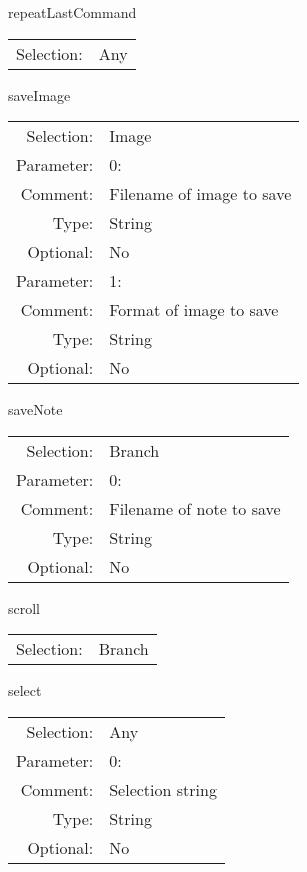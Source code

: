 \item repeatLastCommand\\
\begin{tabular}{rl}
  Selection: & Any\\
\end{tabular}

\item saveImage\\
\begin{tabular}{rl}
  Selection: & Image\\
   Parameter: &  0:\\
        Comment: & Filename of image to save\\
           Type: & String\\
       Optional: &  No\\
   Parameter: &  1:\\
        Comment: & Format of image to save\\
           Type: & String\\
       Optional: &  No\\
\end{tabular}

\item saveNote\\
\begin{tabular}{rl}
  Selection: & Branch\\
   Parameter: &  0:\\
        Comment: & Filename of note to save\\
           Type: & String\\
       Optional: &  No\\
\end{tabular}

\item scroll\\
\begin{tabular}{rl}
  Selection: & Branch\\
\end{tabular}

\item select\\
\begin{tabular}{rl}
  Selection: & Any\\
   Parameter: &  0:\\
        Comment: & Selection string\\
           Type: & String\\
       Optional: &  No\\
\end{tabular}

